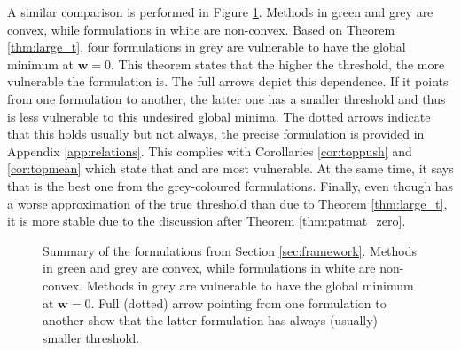 A similar comparison is performed in Figure \ref{fig:thresholds}. Methods in green and grey are convex, while formulations in white are non-convex. Based on Theorem \ref{thm:large_t}, four formulations in grey are vulnerable to have the global minimum at $\bm{w}=0$. This theorem states that the higher the threshold, the more vulnerable the formulation is. The full arrows depict this dependence. If it points from one formulation to another, the latter one has a smaller threshold and thus is less vulnerable to this undesired global minima. The dotted arrows indicate that this holds usually but not always, the precise formulation is provided in Appendix \ref{app:relations}. This complies with Corollaries \ref{cor:toppush} and \ref{cor:topmean} which state that \TopPush and \TopMeanK are most vulnerable. At the same time, it says that \tauFPL is the best one from the grey-coloured formulations. Finally, even though \PatMatNP has a worse approximation of the true threshold than \tauFPL due to Theorem \ref{thm:large_t}, it is more stable due to the discussion after Theorem \ref{thm:patmat_zero}.

\begin{figure}[!ht]
  \centering
  \caption{Summary of the formulations from Section \ref{sec:framework}. Methods in green and grey are convex, while formulations in white are non-convex. Methods in grey are vulnerable to have the global minimum at $\bm{w}=0$. Full (dotted) arrow pointing from one formulation to another show that the latter formulation has always (usually) smaller threshold.}
  \label{fig:thresholds}
\end{figure}

